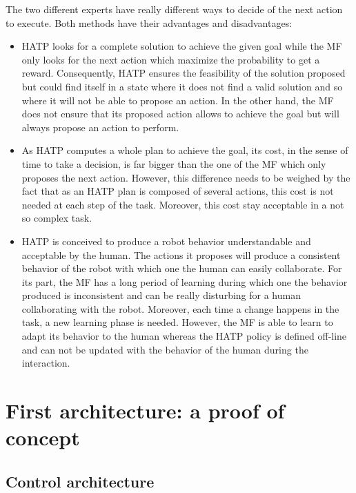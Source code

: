 \documentclass[english,a4paper,11pt,twoside]{StyleThese}
\begin{document}
The two different experts have really different ways to decide of the next action to execute. Both methods have their advantages and disadvantages:
\begin{itemize}
\item HATP looks for a complete solution to achieve the given goal while the MF only looks for the next action which maximize the probability to get a reward. Consequently, HATP ensures the feasibility of the solution proposed but could find itself in a state where it does not find a valid solution and so where it will not be able to propose an action. In the other hand, the MF does not ensure that its proposed action allows to achieve the goal but will always propose an action to perform.
\item As HATP computes a whole plan to achieve the goal, its cost, in the sense of time to take a decision, is far bigger than the one of the MF which only proposes the next action. However, this difference needs to be weighed by the fact that as an HATP plan is composed of several actions, this cost is not needed at each step of the task. Moreover, this cost stay acceptable in a not so complex task.
\item HATP is conceived to produce a robot behavior understandable and acceptable by the human. The actions it proposes will produce a consistent behavior of the robot with which one the human can easily collaborate. For its part, the MF has a long period of learning during which one the behavior produced is inconsistent and can be really disturbing for a human collaborating with the robot. Moreover, each time a change happens in the task, a new learning phase is needed. However, the MF is able to learn to adapt its behavior to the human whereas the HATP policy is defined off-line and can not be updated with the behavior of the human during the interaction.
\end{itemize}


\section{First architecture: a proof of concept}


\subsection{Control architecture}
\end{document}
